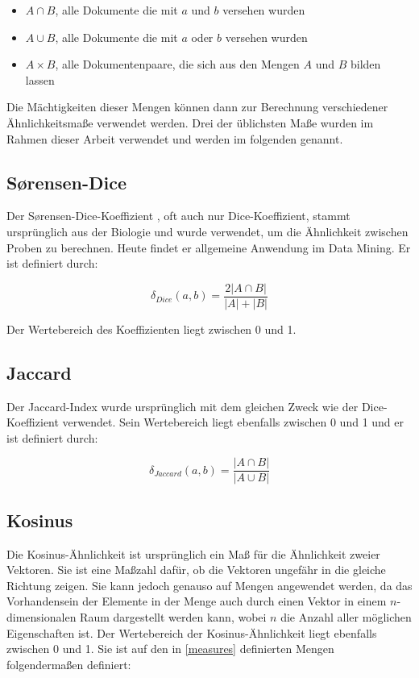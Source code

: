 \begin{itemize}
    \item \(A \cap B\), alle Dokumente die mit \(a\) und \(b\) versehen wurden
    \item \(A \cup B\), alle Dokumente die mit \(a\) oder \(b\) versehen wurden
    \item \(A \times B\), alle Dokumentenpaare, die sich aus den Mengen \(A\) und \(B\) bilden lassen
\end{itemize}

Die Mächtigkeiten dieser Mengen können dann zur Berechnung verschiedener Ähnlichkeitsmaße verwendet werden. Drei der üblichsten Maße wurden im Rahmen dieser Arbeit verwendet und werden im folgenden genannt.

\subsection{Sørensen-Dice}

Der Sørensen-Dice-Koeffizient \cite{st1948} \cite{ld1945}, oft auch nur Dice-Koeffizient, stammt ursprünglich aus der Biologie und wurde verwendet, um die Ähnlichkeit zwischen Proben zu berechnen. Heute findet er allgemeine Anwendung im Data Mining. Er ist definiert durch:

\[
\delta_{Dice}(a, b) = \frac{2|A \cap B|}{|A|+|B|}
\]

Der Wertebereich des Koeffizienten liegt zwischen \num{0} und \num{1}.

\subsection{Jaccard}

Der Jaccard-Index \cite{pj19012} wurde ursprünglich mit dem gleichen Zweck wie der Dice-Koeffizient verwendet. Sein Wertebereich liegt ebenfalls zwischen \num{0} und \num{1} und er ist definiert durch:

\[
\delta_{Jaccard}(a,b) = \frac{|A \cap B|}{|A \cup B|}
\]

\subsection{Kosinus}

Die Kosinus-Ähnlichkeit \cite{hkp2012} ist ursprünglich ein Maß für die Ähnlichkeit zweier Vektoren. Sie ist eine Maßzahl dafür, ob die Vektoren ungefähr in die gleiche Richtung zeigen. Sie kann jedoch genauso auf Mengen angewendet werden, da das Vorhandensein der Elemente in der Menge auch durch einen Vektor in einem \(n\)-dimensionalen Raum dargestellt werden kann, wobei \(n\) die Anzahl aller möglichen Eigenschaften ist. Der Wertebereich der Kosinus-Ähnlichkeit liegt ebenfalls zwischen \num{0} und \num{1}. Sie ist auf den in \ref{measures} definierten Mengen folgendermaßen definiert:

